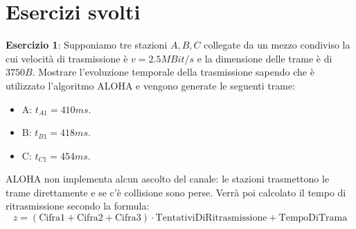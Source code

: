 %

\section{Esercizi svolti}
\textbf{Esercizio 1}: Supponiamo tre stazioni $A, B, C$ collegate da un mezzo condiviso la cui velocità di trasmissione è $v=2.5MBit/s$ e la dimensione
delle trame è di $3750B$. Mostrare l'evoluzione temporale della trasmissione sapendo che è utilizzato l'algoritmo ALOHA e vengono generate le seguenti
trame: \begin{itemize}
    \item A: $t_{A1}=410ms$.
    \item B: $t_{B1}=418ms$.
    \item C: $t_{C1}=454ms$.
\end{itemize}

\noindent ALOHA non implementa alcun ascolto del canale: le stazioni trasmettono le trame direttamente e se c'è collisione sono perse. Verrà poi
calcolato il tempo di ritrasmissione secondo la formula: \[
    z = (\text{Cifra1}+\text{Cifra2}+\text{Cifra3})\cdot \text{TentativiDiRitrasmissione} + \text{TempoDiTrama}
\]

